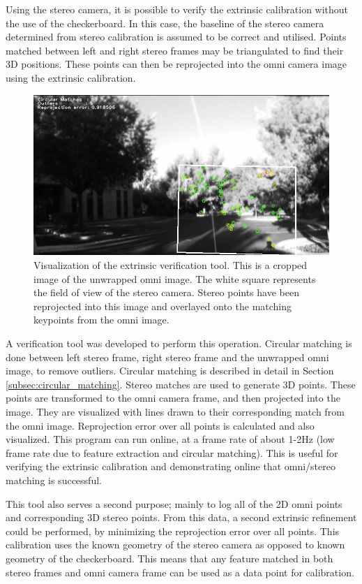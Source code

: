 Using the stereo camera, it is possible to verify the extrinsic calibration without the use of the checkerboard.  In this case, the baseline of the stereo camera determined from stereo calibration is assumed to be correct and utilised.  Points matched between left and right stereo frames may be triangulated to find their 3D positions.  These points can then be reprojected into the omni camera image using the extrinsic calibration.

\begin{figure}[h!]
  \centering
    \includegraphics[width=1.0\textwidth]{chapters/images/circ_matches}
  \caption{Visualization of the extrinsic verification tool. This is a cropped image of the unwrapped omni image.  The white square represents the field of view of the stereo camera.  Stereo points have been reprojected into this image and overlayed onto the matching keypoints from the omni image. }
  \label{fig:circ_matches}
\end{figure}
\newpage
A verification tool was developed to perform this operation.  Circular matching is done between left stereo frame, right stereo frame and the unwrapped omni image, to remove outliers.  Circular matching is described in detail in Section \ref{subsec:circular_matching}. Stereo matches are used to generate 3D points.  These points are transformed to the omni camera frame, and then projected into the image.  They are visualized with lines drawn to their corresponding match from the omni image.  Reprojection error over all points is calculated and also visualized.  This program can run online, at a frame rate of about 1-2Hz (low frame rate due to feature extraction and circular matching).  This is useful for verifying the extrinsic calibration and demonstrating online that omni/stereo matching is successful.

This tool also serves a second purpose; mainly to log all of the 2D omni points and corresponding 3D stereo points.  From this data, a second extrinsic refinement could be performed, by minimizing the reprojection error over all points.  This calibration uses the known geometry of the stereo camera as opposed to known geometry of the checkerboard.  This means that any feature matched in both stereo frames and omni camera frame can be used as a data point for calibration.

